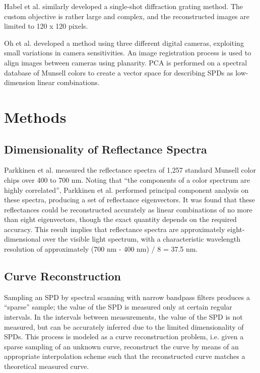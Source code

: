 \documentclass[twocolumn,10pt]{asme2ej}
\newcommand{\id}{\hspace{6 mm}}
\begin{document}
\id Habel et al. \cite{Habel} similarly developed a single-shot diffraction grating method. The custom objective is rather large and complex, and the reconstructed images are limited to 120 x 120 pixels.

\id Oh et al. \cite{Oh} developed a method using three different digital cameras, exploiting small variations in camera sensitivities. An image registration process is used to align images between cameras using planarity. PCA is performed on a spectral database of Munsell colors to create a vector space for describing SPDs as low-dimension linear combinations.

\section{Methods}

\subsection{Dimensionality of Reflectance Spectra}

Parkkinen et al. \cite{Parkkinen} measured the reflectance spectra of 1,257 standard Munsell color chips over 400 to 700 nm. Noting that ``the components of a color spectrum are highly correlated'', Parkkinen et al. performed principal component analysis on these spectra, producing a set of reflectance eigenvectors. It was found that these reflectances could be reconstructed accurately as linear combinations of no more than eight eigenvectors, though the exact quantity depends on the required accuracy. This result implies that reflectance spectra are approximately eight-dimensional over the visible light spectrum, with a characteristic wavelength resolution of approximately (700 nm - 400 nm) / 8 = 37.5 nm.

\subsection{Curve Reconstruction}
\label{curve_reconstruction}

Sampling an SPD by spectral scanning with narrow bandpass filters produces a ``sparse'' sample; the value of the SPD is measured only at certain regular intervals. In the intervals between measurements, the value of the SPD is not measured, but can be accurately inferred due to the limited dimensionality of SPDs. This process is modeled as a curve reconstruction problem, i.e. given a sparse sampling of an unknown curve, reconstruct the curve by means of an appropriate interpolation scheme such that the reconstructed curve matches a theoretical measured curve.
\end{document}
